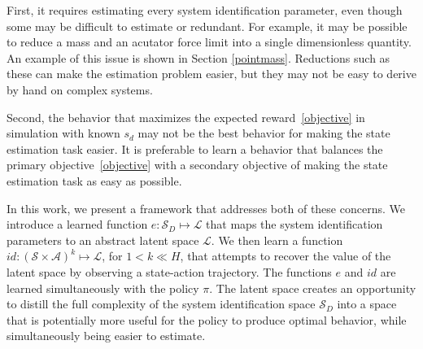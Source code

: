 \documentclass{article}
\newcommand{\cA}{\mathcal{A}}
\newcommand{\cL}{\mathcal{L}}
\newcommand{\cS}{\mathcal{S}}
\newcommand{\embedfn}{e}
\newcommand{\idfn}{id}
\newcommand{\latent}{\cL}
\newcommand{\secref}[1]{Section \ref{#1}}
\begin{document}
First, it requires estimating every system identification parameter,
even though some may be difficult to estimate or redundant.
For example, it may be possible to reduce a mass and an acutator force limit into a single dimensionless quantity.
An example of this issue is shown in \secref{pointmass}.
Reductions such as these can make the estimation problem easier, but they may not be easy to derive by hand on complex systems.

Second, the behavior that maximizes the expected reward~\eqref{objective}
in simulation with known $s_d$ may not be the best behavior for making the state estimation task easier.
It is preferable to learn a behavior that balances the primary objective~\eqref{objective}
with a secondary objective of making the state estimation task as easy as possible.

In this work, we present a framework that addresses both of these concerns.
We introduce a learned function $\embedfn : \cS_D \mapsto \latent$
that maps the system identification parameters to an abstract latent space $\latent$.
We then learn a function $\idfn : (\cS \times \cA)^k \mapsto \latent$, for $1 < k \ll H$,
that attempts to recover the value of the latent space by observing a state-action trajectory.
The functions $\embedfn$ and $\idfn$ are learned simultaneously with the policy $\pi$.
The latent space creates an opportunity to distill the full complexity of the system identification space $\cS_D$ into a space that is potentially more useful for the policy to produce optimal behavior,
while simultaneously being easier to estimate.
\end{document}
